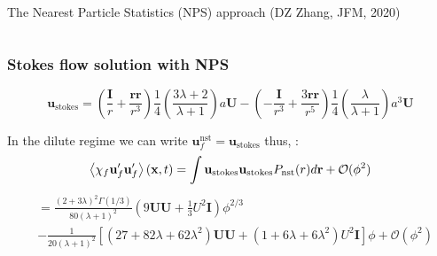 \documentclass{sintefbeamer}
\begin{document}
\begin{frame}{The Nearest Particle Statistics (NPS) approach (DZ Zhang, JFM, 2020)}
\begin{columns}
\end{columns}

\end{frame}





\begin{frame}
  \frametitle{Stokes flow solution with NPS}
  \begin{small}
    \begin{equation*}
      \textbf{u}_\text{stokes} 
      = \left(\frac{ \textbf{I}}{r} + \frac{\textbf{rr}}{r^3}\right)  \frac{1}{4}\left(\frac{3\lambda + 2}{\lambda +1}\right) a \textbf{U}
      - \left(-\frac{\textbf{I}}{r^3} + \frac{3 \textbf{rr} }{r^5}\right)  \frac{1}{4}\left(\frac{\lambda}{\lambda +1}\right) a^3 \textbf{U}
    \end{equation*}
  \end{small}
  In the dilute regime we can write $\textbf{u}_f^\text{nst} = \textbf{u}_\text{stokes}$ thus,  :
  \begin{equation*}
    \left<\chi_f \textbf{u}'_f\textbf{u}'_f\right>(\textbf{x},t)
    = 
    {\int \textbf{u}_\text{stokes} \textbf{u}_\text{stokes}  
    P_\text{nst}(r) d\textbf{r} }
    + \mathcal{O}(\phi^2)
  \end{equation*}\pause
  \begin{equation*}
    \boxed{
    \begin{aligned}
    &=  \frac{(2+3\lambda)^2\Gamma(1/3)}{80(\lambda+1)^2}\left(
      9 \textbf{UU}
      + \frac{1}{3}U^2 \textbf{I}
    \right)\phi^{2/3}\\
    &- 
    \frac{1}{20(\lambda+1)^2}\left[
      (27+82\lambda + 62\lambda^2) \textbf{UU}
      + (1+6\lambda + 6\lambda^2) U^2 \textbf{I}
    \right]\phi+ \mathcal{O}(\phi^2)
    \end{aligned}
    }
  \end{equation*}
  \begin{itemize}

\end{itemize}
\end{frame}
\end{document}
